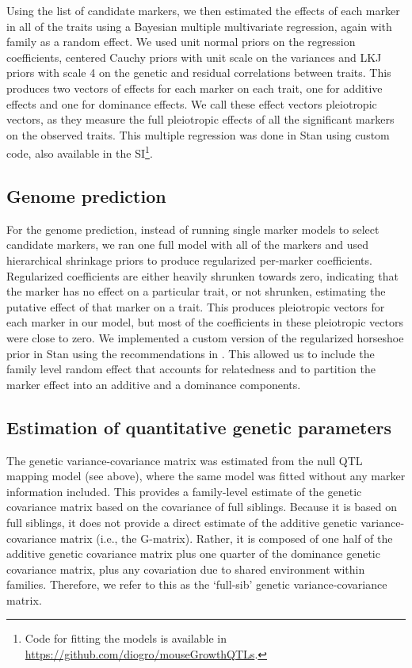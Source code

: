 \begin{refsection}
Using the list of candidate markers, we then estimated the effects of each
marker in all of the traits using a Bayesian multiple multivariate regression,
again with family as a random effect. We used unit normal priors on the
regression coefficients, centered Cauchy priors with unit scale on the
variances and LKJ priors with scale 4 on the genetic and residual correlations
between traits. This produces two vectors of effects for each marker on each
trait, one for additive effects and one for dominance effects. We call these
effect vectors pleiotropic vectors, as they measure the full pleiotropic
effects of all the significant markers on the observed traits. This multiple
regression was done in Stan \parencite{Carpenter2017-pn} using custom code,
also available in the SI\footnote{Code for fitting the models is available in
\url{https://github.com/diogro/mouseGrowthQTLs}.}.

\subsection{Genome prediction}

For the genome prediction, instead of running single marker models to select
candidate markers, we ran one full model with all of the markers and used
hierarchical shrinkage priors to produce regularized per-marker coefficients.
Regularized coefficients are either heavily shrunken towards zero, indicating
that the marker has no effect on a particular trait, or not shrunken,
estimating the putative effect of that marker on a trait. This produces
pleiotropic vectors for each marker in our model, but most of the coefficients
in these pleiotropic vectors were close to zero. We implemented a custom
version of the regularized horseshoe prior in Stan using the recommendations
in \textcite{Piironen2017-ih}. This allowed us to include the family level
random effect that accounts for relatedness and to partition the marker effect
into an additive and a dominance components.

\subsection{Estimation of quantitative genetic parameters}

The genetic variance-covariance matrix was estimated from the null QTL
mapping model (see above), where the same model was fitted without any
marker information included. This provides a family-level estimate of
the genetic covariance matrix based on the covariance of full siblings. Because it is
based on full siblings, it does not provide a direct estimate of the
additive genetic variance-covariance matrix (i.e., the G-matrix).
Rather, it is composed of one half of the additive genetic covariance
matrix plus one quarter of the dominance genetic covariance matrix, plus
any covariation due to shared environment within families. Therefore, we
refer to this as the `full-sib' genetic variance-covariance matrix.


\end{refsection}
